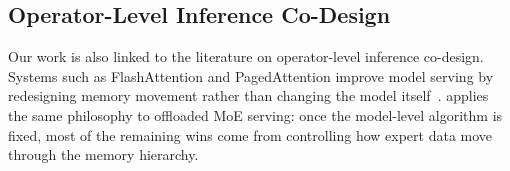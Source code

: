 \subsection{Operator-Level Inference Co-Design}

Our work is also linked to the literature on operator-level inference co-design. Systems such as FlashAttention and PagedAttention improve model serving by redesigning memory movement rather than changing the model itself~\cite{dao2022flashattention,dao2024flashattention2,kwon2023vllm}. \sysname applies the same philosophy to offloaded MoE serving: once the model-level algorithm is fixed, most of the remaining wins come from controlling how expert data move through the memory hierarchy.